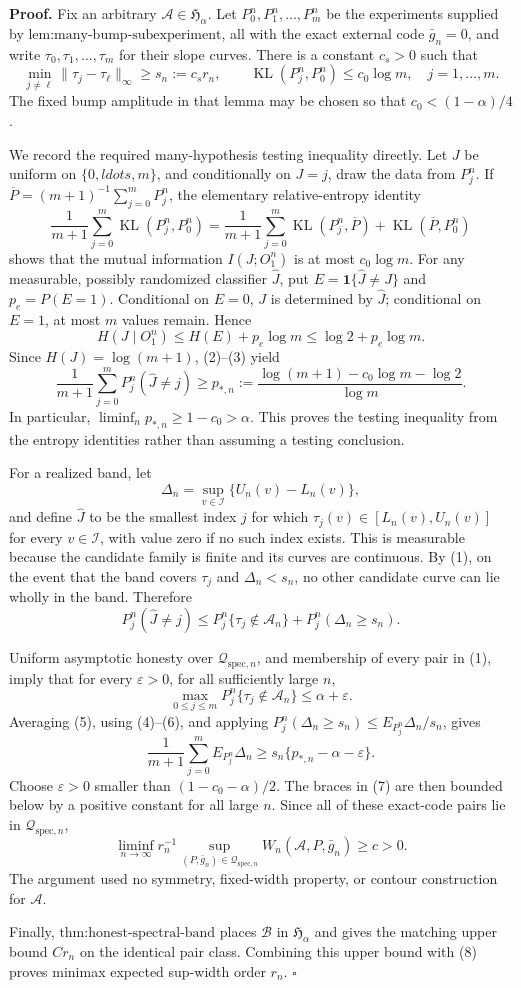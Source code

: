 \textbf{Proof.}
Fix an arbitrary \(\mathcal A\in\mathfrak H_\alpha\).  Let \(P_0^n,P_1^n,\ldots,P_m^n\) be the experiments supplied by \(\text{lem:many-bump-subexperiment}\), all with the exact external code \(\bar g_n=0\), and write \(\tau_0,\tau_1,\ldots,\tau_m\) for their slope curves.  There is a constant \(c_s>0\) such that
\[
 \min_{j\ne\ell}\|\tau_j-\tau_\ell\|_\infty
 \ge s_n:=c_sr_n, \qquad
 \operatorname{KL}(P_j^n,P_0^n)\le c_0\log m,
 \quad j=1,\ldots,m. \tag{1}
\]
The fixed bump amplitude in that lemma may be chosen so that \(c_0<(1-\alpha)/4\).

We record the required many-hypothesis testing inequality directly.  Let \(J\) be uniform on \(\{0,ldots,m\}\), and conditionally on \(J=j\), draw the data from \(P_j^n\).  If \(\overline P=(m+1)^{-1}\sum_{j=0}^mP_j^n\), the elementary relative-entropy identity
\[
 \frac1{m+1}\sum_{j=0}^m\operatorname{KL}(P_j^n,P_0^n)
 =\frac1{m+1}\sum_{j=0}^m\operatorname{KL}(P_j^n,\overline P)
 +\operatorname{KL}(\overline P,P_0^n) \tag{2}
\]
shows that the mutual information \(I(J;O_1^n)\) is at most \(c_0\log m\).  For any measurable, possibly randomized classifier \(\widehat J\), put \(E=\mathbf 1\{\widehat J\ne J\}\) and \(p_e=P(E=1)\).  Conditional on \(E=0\), \(J\) is determined by \(\widehat J\); conditional on \(E=1\), at most \(m\) values remain.  Hence
\[
 H(J\mid O_1^n)
 \le H(E)+p_e\log m
 \le\log2+p_e\log m. \tag{3}
\]
Since \(H(J)=\log(m+1)\), (2)--(3) yield
\[
 \frac1{m+1}\sum_{j=0}^mP_j^n(\widehat J\ne j)
 \ge p_{*,n}:=\frac{\log(m+1)-c_0\log m-\log2}{\log m}. \tag{4}
\]
In particular, \(\liminf_np_{*,n}\ge1-c_0>\alpha\).  This proves the testing inequality from the entropy identities rather than assuming a testing conclusion.

For a realized band, let
\[
 \Delta_n=\sup_{v\in\mathcal I}\{U_n(v)-L_n(v)\},
\]
and define \(\widehat J\) to be the smallest index \(j\) for which \(\tau_j(v)\in[L_n(v),U_n(v)]\) for every \(v\in\mathcal I\), with value zero if no such index exists.  This is measurable because the candidate family is finite and its curves are continuous.  By (1), on the event that the band covers \(\tau_j\) and \(\Delta_n<s_n\), no other candidate curve can lie wholly in the band.  Therefore
\[
 P_j^n(\widehat J\ne j)
 \le P_j^n\{\tau_j\notin\mathcal A_n\}
 +P_j^n(\Delta_n\ge s_n). \tag{5}
\]

Uniform asymptotic honesty over \(\mathcal Q_{\mathrm{spec},n}\), and membership of every pair in (1), imply that for every \(\varepsilon>0\), for all sufficiently large \(n\),
\[
 \max_{0\le j\le m}P_j^n\{\tau_j\notin\mathcal A_n\}
 \le\alpha+\varepsilon. \tag{6}
\]
Averaging (5), using (4)--(6), and applying
\(P_j^n(\Delta_n\ge s_n)\le E_{P_j^n}\Delta_n/s_n\), gives
\[
 \frac1{m+1}\sum_{j=0}^mE_{P_j^n}\Delta_n
 \ge s_n\{p_{*,n}-\alpha-\varepsilon\}. \tag{7}
\]
Choose \(\varepsilon>0\) smaller than \((1-c_0-\alpha)/2\).  The braces in (7) are then bounded below by a positive constant for all large \(n\).  Since all of these exact-code pairs lie in \(\mathcal Q_{\mathrm{spec},n}\),
\[
 \liminf_{n\to\infty}r_n^{-1}
 \sup_{(P,\bar g_n)\in\mathcal Q_{\mathrm{spec},n}}
 W_n(\mathcal A,P,\bar g_n)\ge c>0. \tag{8}
\]
The argument used no symmetry, fixed-width property, or contour construction for \(\mathcal A\).

Finally, \(\text{thm:honest-spectral-band}\) places \(\mathcal B\) in \(\mathfrak H_\alpha\) and gives the matching upper bound \(Cr_n\) on the identical pair class.  Combining this upper bound with (8) proves minimax expected sup-width order \(r_n\). \(\square\)